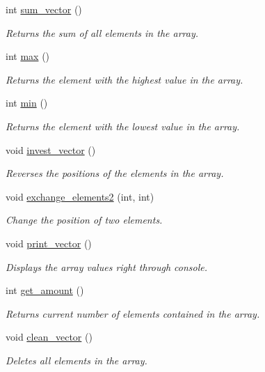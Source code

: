 \begin{DoxyCompactItemize}
int \hyperlink{classarray_adc0ddb6f7348edf390b97e883f4ee773}{sum\-\_\-vector} ()
\begin{DoxyCompactList}\small\item\em Returns the sum of all elements in the array. \end{DoxyCompactList}\item 
int \hyperlink{classarray_aae5279d424036f187c6aa516bbd83c5c}{max} ()
\begin{DoxyCompactList}\small\item\em Returns the element with the highest value in the array. \end{DoxyCompactList}\item 
int \hyperlink{classarray_a9787f152f19d3efaa10661fd8ab5d984}{min} ()
\begin{DoxyCompactList}\small\item\em Returns the element with the lowest value in the array. \end{DoxyCompactList}\item 
void \hyperlink{classarray_ac3d618d2d45fc6734b870e69175191a5}{invest\-\_\-vector} ()
\begin{DoxyCompactList}\small\item\em Reverses the positions of the elements ​​in the array. \end{DoxyCompactList}\item 
void \hyperlink{classarray_a38eae774a7eba29581bf399f33309ffc}{exchange\-\_\-elements2} (int, int)
\begin{DoxyCompactList}\small\item\em Change the position of two elements. \end{DoxyCompactList}\item 
void \hyperlink{classarray_a6fc40f0a530525bb91835af4dcd20565}{print\-\_\-vector} ()
\begin{DoxyCompactList}\small\item\em Displays the array values right through console. \end{DoxyCompactList}\item 
int \hyperlink{classarray_a1e2e2da0c5c43d2a2c6f932036868d38}{get\-\_\-amount} ()
\begin{DoxyCompactList}\small\item\em Returns current number of elements contained in the array. \end{DoxyCompactList}\item 
void \hyperlink{classarray_a22cb040428decbd6b5b4d4be8c03cfd0}{clean\-\_\-vector} ()
\begin{DoxyCompactList}\small\item\em Deletes all elements in the array. \end{DoxyCompactList}\item 

\end{DoxyCompactItemize}
